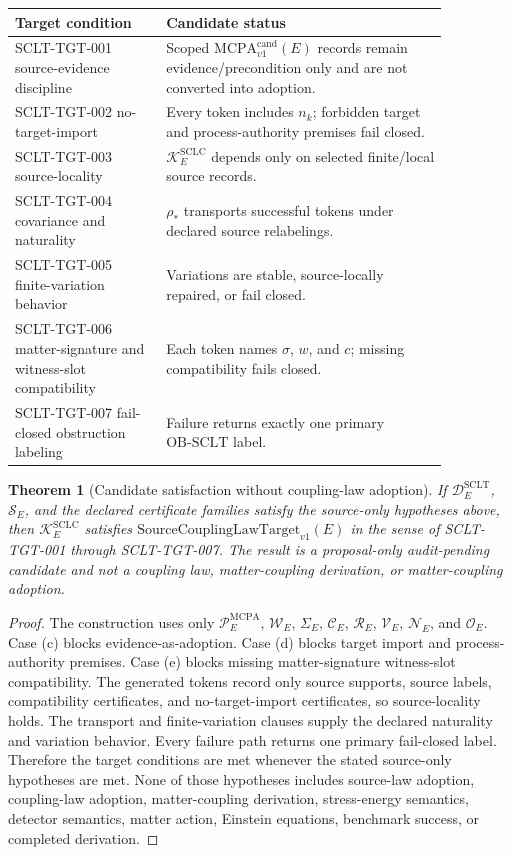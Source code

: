 \documentclass[11pt]{article}
\newcommand{\MCPA}{\mathrm{MCPA}^{\mathrm{cand}}_{v1}}
\newcommand{\SourceCoupTarget}{\mathrm{SourceCouplingLawTarget}_{v1}}
\newtheorem{theorem}{Theorem}
\begin{document}
\begin{longtable}{p{0.30\linewidth}p{0.56\linewidth}}
\toprule
Target condition & Candidate status \\
\midrule
SCLT-TGT-001 source-evidence discipline & Scoped \(\MCPA(E)\) records remain evidence/precondition only and are not converted into adoption. \\
SCLT-TGT-002 no-target-import & Every token includes \(n_k\); forbidden target and process-authority premises fail closed. \\
SCLT-TGT-003 source-locality & \(\mathcal{K}^{\mathrm{SCLC}}_E\) depends only on selected finite/local source records. \\
SCLT-TGT-004 covariance and naturality & \(\rho_*\) transports successful tokens under declared source relabelings. \\
SCLT-TGT-005 finite-variation behavior & Variations are stable, source-locally repaired, or fail closed. \\
SCLT-TGT-006 matter-signature and witness-slot compatibility & Each token names \(\sigma\), \(w\), and \(c\); missing compatibility fails closed. \\
SCLT-TGT-007 fail-closed obstruction labeling & Failure returns exactly one primary \(\mathrm{OB\text{-}SCLT}\) label. \\
\bottomrule
\end{longtable}

\begin{theorem}[Candidate satisfaction without coupling-law adoption]
If \(\mathcal{D}^{\mathrm{SCLT}}_E\), \(\mathcal{S}_E\), and the declared
certificate families satisfy the source-only hypotheses above, then
\(\mathcal{K}^{\mathrm{SCLC}}_E\) satisfies
\(\SourceCoupTarget(E)\) in the sense of SCLT-TGT-001 through
SCLT-TGT-007. The result is a proposal-only audit-pending candidate and not
a coupling law, matter-coupling derivation, or matter-coupling adoption.
\end{theorem}

\begin{proof}
The construction uses only \(\mathcal{P}^{\mathrm{MCPA}}_E\),
\(\mathcal{W}_E\), \(\Sigma_E\), \(\mathcal{C}_E\), \(\mathcal{R}_E\),
\(\mathcal{V}_E\), \(\mathcal{N}_E\), and \(\mathcal{O}_E\). Case (c) blocks
evidence-as-adoption. Case (d) blocks target import and process-authority
premises. Case (e) blocks missing matter-signature witness-slot
compatibility. The generated tokens record only source supports, source
labels, compatibility certificates, and no-target-import certificates, so
source-locality holds. The transport and finite-variation clauses supply the
declared naturality and variation behavior. Every failure path returns one
primary fail-closed label. Therefore the target conditions are met whenever
the stated source-only hypotheses are met. None of those hypotheses includes
source-law adoption, coupling-law adoption, matter-coupling derivation,
stress-energy semantics, detector semantics, matter action, Einstein
equations, benchmark success, or completed derivation.
\end{proof}
\end{document}
